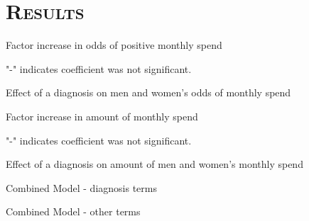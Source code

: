\documentclass[xcolor=x11names,compress]{beamer}
\renewcommand{\(}{\begin{columns}}
\renewcommand{\)}{\end{columns}}
\newcommand{\<}[1]{\begin{column}{#1}}
\renewcommand{\>}{\end{column}}
\begin{document}
\section{\scshape Results}



\begin{frame}
Factor increase in odds of positive monthly spend
\tiny
	
	"-" indicates coefficient was not significant. 
\end{frame}

\begin{frame}
Effect of a diagnosis on men and women's odds of monthly spend

\end{frame}

\begin{frame}
Factor increase in amount of monthly spend
\tiny

"-" indicates coefficient was not significant. 
\end{frame}

\begin{frame}
Effect of a diagnosis on amount of men and women's monthly spend

\end{frame}

\begin{frame}
Combined Model - diagnosis terms

\end{frame}

\begin{frame}
Combined Model - other terms
\tiny

\end{frame}
\end{document}
